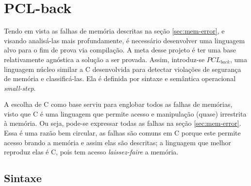 \chapter{PCL-back}


Tendo em vista as falhas de memória descritas na seção \ref{sec:mem-error}, e visando analisá-las mais profundamente, é necessário desenvolver uma linguagem alvo para o fim de prova via compilação. A meta desse projeto é ter uma base relativamente agnóstica a solução a ser provada. Assim, introduz-se $PCL_{back}$, uma linguagem núcleo similar a C desenvolvida para detectar violações de segurança de memória e classificá-las. Ela é definida por sintaxe e semântica operacional \emph{small-step}. 

A escolha de C como base serviu para englobar todos as falhas de memórias, visto que C é uma linguagem que permite acesso e manipulação (quase) irrestrita à memória. Ou seja, pode-se expressar todas as falhas na seção \ref{sec:mem-error}. Essa é uma razão bem circular, as falhas são comuns em C porque este permite acesso brando a memória e assim elas são descritas; a linguagem que melhor reproduz elas é C, pois tem acesso \emph{laissez-faire} a memória.


\section{Sintaxe}

